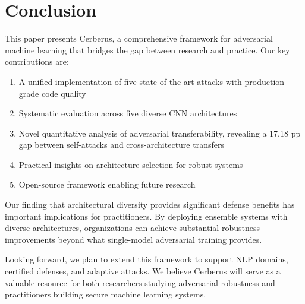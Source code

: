 \documentclass[10pt,conference]{IEEEtran}
\begin{document}
\section{Conclusion}
\label{sec:conclusion}

This paper presents Cerberus, a comprehensive framework for adversarial machine learning that bridges the gap between research and practice. Our key contributions are:

\begin{enumerate}
    \item A unified implementation of five state-of-the-art attacks with production-grade code quality
    \item Systematic evaluation across five diverse CNN architectures
    \item Novel quantitative analysis of adversarial transferability, revealing a 17.18 pp gap between self-attacks and cross-architecture transfers
    \item Practical insights on architecture selection for robust systems
    \item Open-source framework enabling future research
\end{enumerate}

Our finding that architectural diversity provides significant defense benefits has important implications for practitioners. By deploying ensemble systems with diverse architectures, organizations can achieve substantial robustness improvements beyond what single-model adversarial training provides.

Looking forward, we plan to extend this framework to support NLP domains, certified defenses, and adaptive attacks. We believe Cerberus will serve as a valuable resource for both researchers studying adversarial robustness and practitioners building secure machine learning systems.
\end{document}
